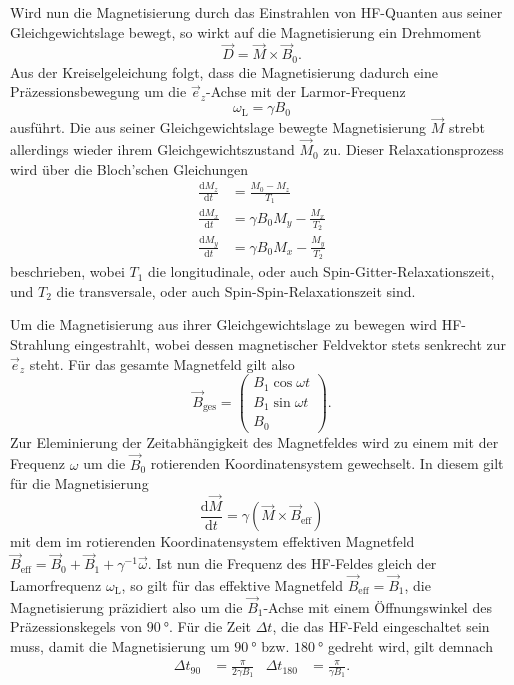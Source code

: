 Wird nun die Magnetisierung durch das Einstrahlen von HF-Quanten aus seiner Gleichgewichtslage bewegt, so wirkt auf die Magnetisierung ein Drehmoment
\begin{equation*}
  \vec{D} = \vec{M} \times \vec{B}_0.
\end{equation*}
Aus der Kreiselgeleichung folgt, dass die Magnetisierung dadurch eine Präzessionsbewegung um die $\vec{e}_z$-Achse mit der Larmor-Frequenz
\begin{equation*}
  \omega_\mathrm{L} = \gamma B_0
\end{equation*}
ausführt. Die aus seiner Gleichgewichtslage bewegte Magnetisierung $\vec{M}$ strebt allerdings wieder ihrem Gleichgewichtszustand $\vec{M}_0$ zu. Dieser Relaxationsprozess wird über die Bloch'schen Gleichungen
\begin{align*}
  \frac{\mathrm{d}M_z}{\mathrm{d}t} &= \frac{M_0 - M_z}{T_1} \\
  \frac{\mathrm{d}M_x}{\mathrm{d}t} &= \gamma B_0 M_y - \frac{M_x}{T_2} \\
  \frac{\mathrm{d}M_y}{\mathrm{d}t} &= \gamma B_0 M_x - \frac{M_y}{T_2}
\end{align*}
beschrieben, wobei $T_1$ die longitudinale, oder auch Spin-Gitter-Relaxationszeit, und $T_2$ die transversale, oder auch Spin-Spin-Relaxationszeit sind.

Um die Magnetisierung aus ihrer Gleichgewichtslage zu bewegen wird HF-Strahlung eingestrahlt, wobei dessen magnetischer Feldvektor stets senkrecht zur $\vec{e}_z$ steht. Für das gesamte Magnetfeld gilt also
\begin{equation*}
  \vec{B}_\mathrm{ges} = \begin{pmatrix} B_1 \cos \omega t \\ B_1 \sin \omega t \\ B_0 \end{pmatrix}.
\end{equation*}
Zur Eleminierung der Zeitabhängigkeit des Magnetfeldes wird zu einem mit der Frequenz $\omega$ um die $\vec{B}_0$ rotierenden Koordinatensystem gewechselt. In diesem gilt für die Magnetisierung
\begin{equation*}
  \frac{\mathrm{d}\vec{M}}{\mathrm{d}t} = \gamma \left( \vec{M} \times \vec{B}_\mathrm{eff} \right)
\end{equation*}
mit dem im rotierenden Koordinatensystem effektiven Magnetfeld $\vec{B}_\mathrm{eff} = \vec{B}_0 + \vec{B}_1 + \gamma^{-1} \vec{\omega}$.
Ist nun die Frequenz des HF-Feldes gleich der Lamorfrequenz $\omega_\mathrm{L}$, so gilt für das effektive Magnetfeld $\vec{B}_\mathrm{eff} = \vec{B}_1$, die Magnetisierung präzidiert also um die $\vec{B}_1$-Achse mit einem Öffnungswinkel des Präzessionskegels von $\SI{90}{\degree}$. Für die Zeit $\Delta t$, die das HF-Feld eingeschaltet sein muss, damit die Magnetisierung um $\SI{90}{\degree}$ bzw. $\SI{180}{\degree}$ gedreht wird, gilt demnach
\begin{align*}
  \Delta t_{90} &= \frac{\pi}{2 \gamma B_1} & \Delta t_{180} &= \frac{\pi}{\gamma B_1}.
\end{align*}


